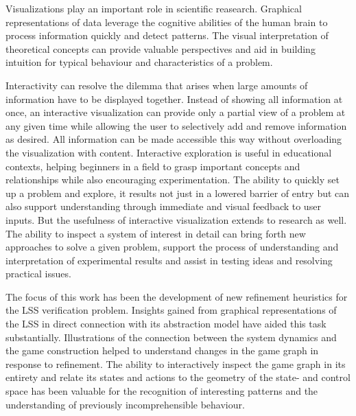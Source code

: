Visualizations play an important role in scientific reasearch.
Graphical representations of data leverage the cognitive abilities of the human brain to process information quickly and detect patterns.
The visual interpretation of theoretical concepts can provide valuable perspectives and aid in building intuition for typical behaviour and characteristics of a problem.

Interactivity can resolve the dilemma that arises when large amounts of information have to be displayed together.
Instead of showing all information at once, an interactive visualization can provide only a partial view of a problem at any given time while allowing the user to selectively add and remove information as desired.
All information can be made accessible this way without overloading the visualization with content.
Interactive exploration is useful in educational contexts, helping beginners in a field to grasp important concepts and relationships while also encouraging experimentation.
The ability to quickly set up a problem and explore, it results not just in a lowered barrier of entry but can also support understanding through immediate and visual feedback to user inputs.
But the usefulness of interactive visualization extends to research as well.
The ability to inspect a system of interest in detail can bring forth new approaches to solve a given problem, support the process of understanding and interpretation of experimental results and assist in testing ideas and resolving practical issues.

The focus of this work has been the development of new refinement heuristics for the LSS verification problem.
Insights gained from graphical representations of the LSS in direct connection with its abstraction model have aided this task substantially.
Illustrations of the connection between the system dynamics and the game construction helped to understand changes in the game graph in response to refinement.
The ability to interactively inspect the game graph in its entirety and relate its states and actions to the geometry of the state- and control space has been valuable for the recognition of interesting patterns and the understanding of previously incomprehensible behaviour.

